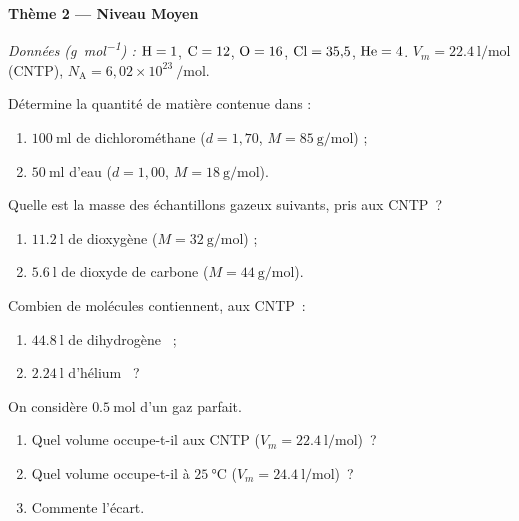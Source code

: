 \documentclass[11pt,a4paper]{article}
\begin{document}
\begin{center}{\large\bfseries\color{primarydark} Thème 2 — Niveau Moyen}\end{center}
\emph{Données (\si{\gram\per\mole}) :} $\ce{H}=1$, $\ce{C}=12$, $\ce{O}=16$, $\ce{Cl}=35{,}5$,
$\ce{He}=4$. \quad $V_m = \SI{22.4}{\litre\per\mole}$ (CNTP), $N_{\mathrm{A}} = 6{,}02\times10^{23}\ \si{\per\mole}$.

\begin{exo}
Détermine la quantité de matière contenue dans :
\begin{enumerate}[label=\alph*)]
  \item $\SI{100}{\milli\litre}$ de dichlorométhane  ($d = 1{,}70$, $M = \SI{85}{\gram\per\mole}$) ;
  \item $\SI{50}{\milli\litre}$ d'eau  ($d = 1{,}00$, $M = \SI{18}{\gram\per\mole}$).
\end{enumerate}
\end{exo}

\begin{exo}
Quelle est la masse des échantillons gazeux suivants, pris aux CNTP~?
\begin{enumerate}[label=\alph*)]
  \item $\SI{11.2}{\litre}$ de dioxygène  ($M = \SI{32}{\gram\per\mole}$) ;
  \item $\SI{5.6}{\litre}$ de dioxyde de carbone  ($M = \SI{44}{\gram\per\mole}$).
\end{enumerate}
\end{exo}

\begin{exo}
Combien de molécules contiennent, aux CNTP~:
\begin{enumerate}[label=\alph*)]
  \item $\SI{44.8}{\litre}$ de dihydrogène ~;
  \item $\SI{2.24}{\litre}$ d'hélium ~?
\end{enumerate}
\end{exo}

\begin{exo}
On considère $\SI{0.5}{\mole}$ d'un gaz parfait.
\begin{enumerate}[label=\alph*)]
  \item Quel volume occupe-t-il aux CNTP ($V_m = \SI{22.4}{\litre\per\mole}$)~?
  \item Quel volume occupe-t-il à $\SI{25}{\celsius}$ ($V_m = \SI{24.4}{\litre\per\mole}$)~?
  \item Commente l'écart.
\end{enumerate}
\end{exo}
\end{document}
